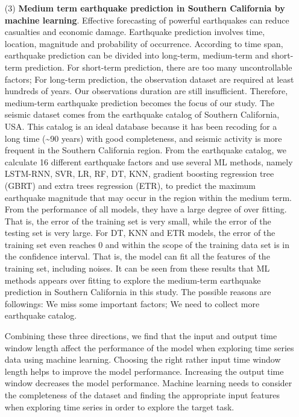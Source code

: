 \begin{enumerate}
  \item[(3)] \textbf{Medium term earthquake prediction in Southern California by machine learning}. Effective forecasting of powerful earthquakes can reduce casualties and economic damage. Earthquake prediction involves time, location, magnitude and probability of occurrence. According to time span, earthquake prediction can be divided into long-term, medium-term and short-term prediction. For short-term prediction, there are too many uncontrollable factors; For long-term prediction, the observation dataset are required at least hundreds of years. Our observations duration are still insufficient. Therefore, medium-term earthquake prediction becomes the focus of our study. The seismic dataset comes from the earthquake catalog of Southern California, USA. This catalog is an ideal database because it has been recoding for a long time (\sim 90 years) with good completeness, and seismic activity is more frequent in the Southern California region. From the earthquake catalog, we calculate 16 different earthquake factors and use several ML methods, namely LSTM-RNN, SVR, LR, RF, DT, KNN, gradient boosting regression tree (GBRT) and extra trees regression (ETR), to predict the maximum earthquake magnitude that may occur in the region within the medium term. From the performance of all models, they have a large degree of over fitting. That is, the error of the training set is very small, while the error of the testing set is very large. For DT, KNN and ETR models, the error of the training set even reaches 0 and within the scope of the training data set is in the confidence interval. That is, the model can fit all the features of the training set, including noises. It can be seen from these results that ML methods appears over fitting to explore the medium-term earthquake prediction in Southern California in this study. The possible reasons are followings: We miss some important factors; We need to collect more earthquake catalog.

  Combining these three directions, we find that the input and output time window length affect the performance of the model when exploring time series data using machine learning. Choosing the right rather input time window length helps to improve the model performance. Increasing the output time window decreases the model performance. Machine learning needs to consider the completeness of the dataset and finding the appropriate input features when exploring time series in order to explore the target task.

\end{enumerate}
